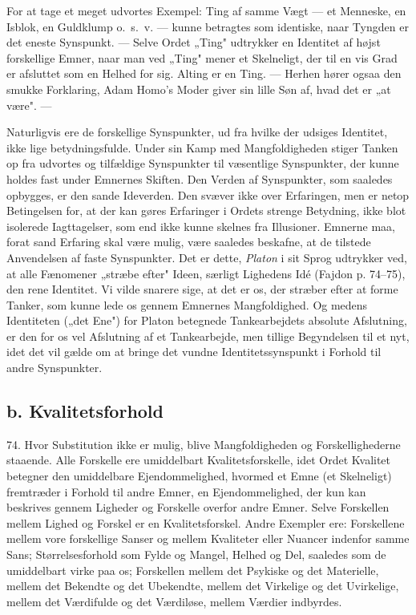 \documentclass[12pt,a4paper]{book}
\newcommand{\opage}[1]{\marginnote{\footnotesize\textit{[#1]}}}
\begin{document}
For at tage et meget udvortes Exempel: Ting af samme Vægt --- et
Menneske, en Isblok, en Guldklump o.\ s.\ v. --- kunne betragtes som
identiske, naar Tyngden er det eneste Synspunkt. --- Selve Ordet „Ting"
udtrykker en Identitet af højst forskellige Emner, naar man ved „Ting"
mener et Skelneligt, der til en vis Grad er afsluttet som en Helhed for
sig. Alting er en Ting. --- Herhen hører ogsaa den smukke Forklaring,
Adam Homo's Moder giver sin lille Søn af, hvad det er „at være". ---

Naturligvis ere de forskellige Synspunkter, ud fra hvilke der udsiges
Identitet, ikke lige betydningsfulde. Under sin Kamp med Mangfoldigheden
stiger Tanken op fra udvortes og tilfældige Synspunkter til væsentlige
Synspunkter, der kunne holdes fast under Emnernes Skiften. Den Verden af
Synspunkter, som saaledes opbygges, er den sande Ideverden. Den svæver
ikke over Erfaringen, men er netop Betingelsen for, at der kan gøres
Erfaringer i Ordets strenge Betydning, ikke blot isolerede
Iagttagelser, som end ikke kunne skelnes fra Illusioner. Emnerne maa,
forat sand Erfaring skal være mulig, være saaledes beskafne, at de
tilstede Anvendelsen af faste Synspunkter. Det er dette, \emph{Platon} i
sit Sprog udtrykker ved, at alle Fænomener „stræbe efter" Ideen,
særligt Lighedens Idé (Fajdon p. 74--75), den rene Identitet. Vi
vilde snarere sige, at det er os, der stræber efter at forme Tanker, som
kunne lede os gennem Emnernes Mangfoldighed. Og medens Identiteten („det
Ene") for Platon betegnede Tankearbejdets absolute Afslutning, er den
for os vel Afslutning af et Tankearbejde, men tillige Begyndelsen til et
nyt, idet det vil gælde om at bringe det vundne Identitetssynspunkt i
Forhold til andre Synspunkter.

\subsection*{b. Kvalitetsforhold}

74. Hvor Substitution ikke er mulig, blive Mangfoldigheden og
Forskellighederne staaende. Alle Forskelle ere \opage{181} umiddelbart
Kvalitetsforskelle, idet Ordet Kvalitet betegner den umiddelbare
Ejendommelighed, hvormed et Emne (et Skelneligt) fremtræder i Forhold
til andre Emner, en Ejendommelighed, der kun kan beskrives gennem
Ligheder og Forskelle overfor andre Emner. Selve Forskellen mellem
Lighed og Forskel er en Kvalitetsforskel. Andre Exempler ere:
Forskellene mellem vore forskellige Sanser og mellem Kvaliteter eller
Nuancer indenfor samme Sans; Størrelsesforhold som Fylde og Mangel,
Helhed og Del, saaledes som de umiddelbart virke paa os; Forskellen
mellem det Psykiske og det Materielle, mellem det Bekendte og det
Ubekendte, mellem det Virkelige og det Uvirkelige, mellem det
Værdifulde og det Værdiløse, mellem Værdier indbyrdes.
\end{document}
